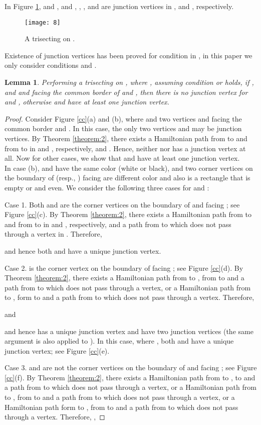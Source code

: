 \documentclass[preprint,12pt]{elsarticle}
\newtheorem{lem}{Lemma}[section]
\begin{document}
In Figure \ref{ca},  and ,  and , ,
,  and  are junction vertices in ,
 and , respectively.
\begin{figure}[tb]
  \centering
  \texttt{[image: 8]}
  \caption[]{\small A trisecting on .}
  \label{ca}
\end{figure}
Existence of junction vertices has been proved for condition 
in \cite{CST:AFAFCHPIM}, in this paper we only consider conditions
 and .
\begin{lem} \label{Lemma:7} Performing a trisecting on , where , assuming condition  or 
holds, if , and  and  facing the common border of
 and , then there is no junction vertex for
 and , otherwise  and 
have at least one junction vertex.
\end{lem}
\begin{proof}
Consider Figure \ref{cc}(a) and (b), where  and two vertices
 and  facing the common border  and . In
this case, the only two vertices  and  may be junction
vertices. By Theorem \ref{theorem:2}, there exists a Hamiltonian
path from  to  and from  to  in  and
, respectively, and
.
Hence, neither  nor  has a junction vertex at
all. Now for other cases, we show that  and 
have at least one junction vertex.\\
In case (b),  and  have the same color (white or black), and
two corner vertices on the boundary of  (resp.,
) facing  are different color and also
 is a rectangle that  is empty or  and
even. We consider the following three cases for  and :
\par Case 1. Both  and  are the corner vertices on the boundary
of  and  facing ; see Figure
\ref{cc}(c). By Theorem \ref{theorem:2}, there exists a Hamiltonian
path from  to  and from  to  in  and
, respectively, and a path from  to  which does not pass through a vertex in . Therefore,

and hence both  and  have a unique junction
vertex.
\par Case
2.  is the corner vertex on the boundary of  facing
; see Figure \ref{cc}(d). By Theorem \ref{theorem:2},
there exists a Hamiltonian path from  to , from  to
 and a path from  to  which does not pass through a
vertex, or  a Hamiltonian path from  to , form   to  and a path
from  to  which does not pass through a vertex. Therefore,

and

and hence  has a unique junction vertex and  have
two junction vertices (the same argument is also applied to ). In
this case, where , both  and  have a unique
junction vertex; see Figure \ref{cc}(e).
\par Case 3.  and  are not the corner vertices on the
boundary of  and  facing ; see
Figure \ref{cc}(f). By Theorem \ref{theorem:2}, there exists a
Hamiltonian path from  to ,  to  and a path from
 to  which does not pass through a vertex, or a Hamiltonian path from  to
, from  to  and a path from  to  which does
not pass through a vertex, or a Hamiltonian path form  to , from  to 
and a path from  to  which does not pass through a vertex.
Therefore,
,


\end{proof}
\end{document}
